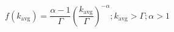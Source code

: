 
\begin{equation}
    f(k_\mathrm{avg})=\frac{\alpha-1}{\Gamma}\left(\frac{k_\mathrm{avg}}{\Gamma}\right)^{-\alpha} ; k_\mathrm{avg} > \Gamma ; \alpha>1
    \label{formula:合成网络的平均度分布}
\end{equation}

